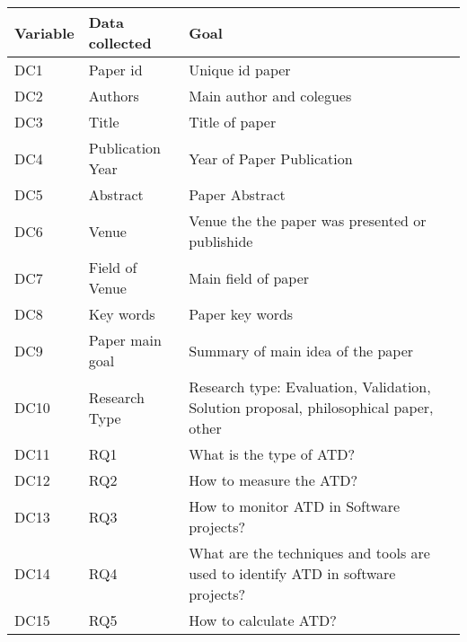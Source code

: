 \begin{tabular}{lll}
\toprule
Variable &    Data collected &                                                                                  Goal \\
\midrule
 DC1 &  Paper id &  Unique id paper \\
 DC2 &  Authors &  Main author and colegues \\
 DC3 &  Title &  Title of paper \\
 DC4 &  Publication Year &  Year of Paper Publication \\
 DC5 &  Abstract &  Paper Abstract \\
 DC6 &  Venue &  Venue the the paper was presented or publishide \\
 DC7 &  Field of Venue &  Main field of paper \\
 DC8 &  Key words &  Paper key words \\
 DC9 &  Paper main goal &  Summary of main idea of the paper \\
 DC10 &  Research Type &  Research type: Evaluation, Validation, Solution proposal, philosophical paper, other \\
 DC11 &  RQ1 &  What is the type of ATD? \\
 DC12 &  RQ2 &  How to measure the ATD? \\
 DC13 &  RQ3 &  How to monitor ATD in Software projects? \\
 DC14 &  RQ4 &  What are the techniques and tools are used to identify ATD in software projects? \\
 DC15 &  RQ5 &  How to calculate ATD? \\
\bottomrule
\end{tabular}
